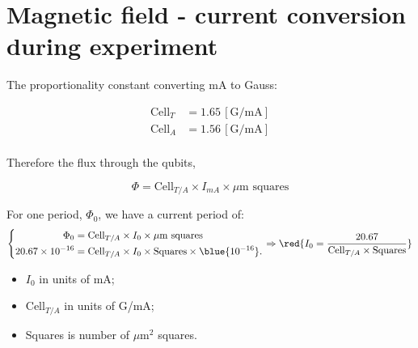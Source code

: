 
\section*{Magnetic field - current conversion during experiment}
The proportionality constant converting mA to Gauss:

\begin{equation}\label{eq:gauss_coil}
  \begin{aligned}
    \text{Cell}_T & = 1.65\,\left[\text{G/mA} \right]\\
    \text{Cell}_A & = 1.56\,\left[\text{G/mA} \right]\\
  \end{aligned}
\end{equation}

\noindent Therefore the  flux through the qubits,  

\[
  \Phi = \text{Cell}_{T/A} \times I_{mA} \times \text{$\mu$m squares}
\]

\noindent

\begin{framed}\noindent
  For one period, $ \Phi_0 $, we have a current period of:
  \[
    \left\lbrace\begin{aligned}
        \Phi_0 & = \text{Cell}_{T/A} \times I_0 \times \text{$\mu$m squares}\\
        20.67\times   10^{-16}  &   =   \text{Cell}_{T/A}   \times  I_0   \times
        \text{Squares} \times \blue{10^{-16}}.
      \end{aligned}\right.  \Rightarrow \red{I_0 =
      \frac{20.67}{\text{Cell}_{T/A}\times \text{Squares}}}
  \]

  \noindent
  \begin{itemize}
  \item $ I_{0} $ in units of mA;
  \item $\text{Cell}_{T/A}$ in units of G/mA;
  \item Squares is number of $\mu$m$^2$ squares.
  \end{itemize}
\end{framed}

\newpage
